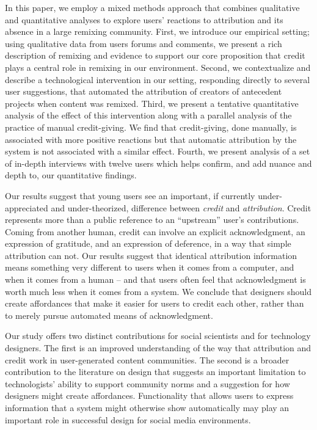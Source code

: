 In this paper, we employ a mixed methods approach that combines
qualitative and quantitative analyses to explore users' reactions to
attribution and its absence in a large remixing community. First, we
introduce our empirical setting; using qualitative data from users
forums and comments, we present a rich description of remixing and
evidence to support our core proposition that credit plays a central
role in remixing in our environment. Second, we contextualize and
describe a technological intervention in our setting, responding
directly to several user suggestions, that automated the attribution
of creators of antecedent projects when content was remixed. Third, we
present a tentative quantitative analysis of the effect of this
intervention along with a parallel analysis of the practice of manual
credit-giving. We find that credit-giving, done manually, is
associated with more positive reactions but that automatic attribution
by the system is not associated with a similar effect. Fourth, we
present analysis of a set of in-depth interviews with twelve users
which helps confirm, and add nuance and depth to, our quantitative
findings.

Our results suggest that young users see an important, if currently
under-appreciated and under-theorized, difference between
\emph{credit} and \emph{attribution}. Credit represents more than a
public reference to an ``upstream'' user's contributions. Coming from
another human, credit can involve an explicit acknowledgment, an
expression of gratitude, and an expression of deference, in a way that
simple attribution can not. Our results suggest that identical
attribution information means something very different to users when
it comes from a computer, and when it comes from a human -- and that
users often feel that acknowledgment is worth much less when it comes
from a system. We conclude that designers should create affordances
that make it easier for users to credit each other, rather than to
merely pursue automated means of acknowledgment.

Our study offers two distinct contributions for social scientists and
for technology designers.  The first is an improved understanding of
the way that attribution and credit work in user-generated content
communities. The second is a broader contribution to the literature on
design that suggests an important limitation to technologists' ability to
support community norms and a suggestion for how designers might
create affordances. Functionality that allows users to
express information that a system might otherwise show automatically
may play an important role in successful design for social media
environments.

